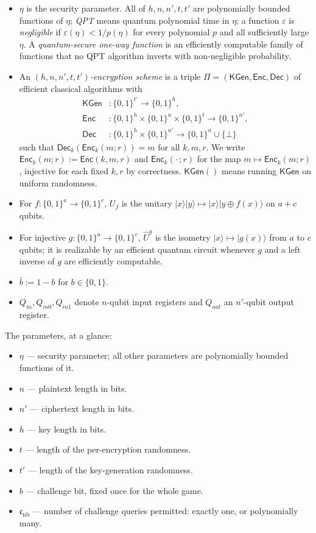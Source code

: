 \documentclass{conjura-conjecture}
\newcommand{\KGen}{\mathsf{KGen}}
\newcommand{\Enc}{\mathsf{Enc}}
\newcommand{\Dec}{\mathsf{Dec}}
\newcommand{\cnb}{\mathfrak{c}_{\mathrm{nb}}}
\newcommand{\ket}[1]{|#1\rangle}
\begin{document}
\begin{itemize}
  \item $\eta$ is the security parameter. All of $h,n,n',t,t'$ are
    polynomially bounded functions of $\eta$; \emph{QPT} means quantum
    polynomial time in $\eta$; a function $\varepsilon$ is
    \emph{negligible} if $\varepsilon(\eta)<1/p(\eta)$ for every
    polynomial $p$ and all sufficiently large $\eta$. A
    \emph{quantum-secure one-way function} is an efficiently computable
    family of functions that no QPT algorithm inverts with
    non-negligible probability.
  \item An \emph{$(h,n,n',t,t')$-encryption scheme} is a triple
    $\Pi=(\KGen,\Enc,\Dec)$ of efficient classical algorithms with
    \begin{align*}
      \KGen&\colon\{0,1\}^{t'}\to\{0,1\}^{h},\\
      \Enc&\colon\{0,1\}^{h}\times\{0,1\}^{n}\times\{0,1\}^{t}
        \to\{0,1\}^{n'},\\
      \Dec&\colon\{0,1\}^{h}\times\{0,1\}^{n'}
        \to\{0,1\}^{n}\cup\{\bot\}
    \end{align*}
    such that $\Dec_k(\Enc_k(m;r))=m$ for all $k,m,r$. We write
    $\Enc_k(m;r):=\Enc(k,m,r)$ and $\Enc_k(\cdot\,;r)$ for the map
    $m\mapsto\Enc_k(m;r)$, injective for each fixed $k,r$ by
    correctness. $\KGen()$ means running $\KGen$ on uniform randomness.
  \item For $f:\{0,1\}^{a}\to\{0,1\}^{c}$, $U_f$ is the unitary
    $\ket{x}\ket{y}\mapsto\ket{x}\ket{y\oplus f(x)}$ on $a+c$ qubits.
  \item For injective $g:\{0,1\}^{a}\to\{0,1\}^{c}$, $\hat U^{g}$ is the
    isometry $\ket{x}\mapsto\ket{g(x)}$ from $a$ to $c$ qubits; it is
    realizable by an efficient quantum circuit whenever $g$ and a left
    inverse of $g$ are efficiently computable.
  \item $\bar b:=1-b$ for $b\in\{0,1\}$.
  \item $Q_{in},Q_{in0},Q_{in1}$ denote $n$-qubit input registers and
    $Q_{out}$ an $n'$-qubit output register.
\end{itemize}

The parameters, at a glance:

\begin{itemize}
  \item $\eta$ --- security parameter; all other parameters are
    polynomially bounded functions of it.
  \item $n$ --- plaintext length in bits.
  \item $n'$ --- ciphertext length in bits.
  \item $h$ --- key length in bits.
  \item $t$ --- length of the per-encryption randomness.
  \item $t'$ --- length of the key-generation randomness.
  \item $b$ --- challenge bit, fixed once for the whole game.
  \item $\cnb$ --- number of challenge queries permitted: exactly one,
    or polynomially many.
\end{itemize}
\end{document}
